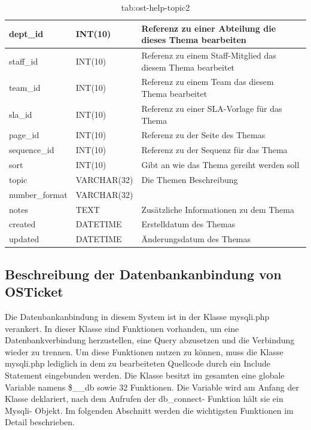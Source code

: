 		\begin{table}[h]
			\begin{tabular}{|p{3.5cm}|p{4cm}|p{6.2cm}|}
		\hline
		dept\_id & INT(10) & Referenz zu einer Abteilung die dieses Thema bearbeiten\\
		\hline
		staff\_id & INT(10) & Referenz zu einem Staff-Mitglied das diesem Thema bearbeitet\\
		\hline
		team\_id & INT(10) & Referenz zu einem Team das diesem Thema bearbeitet\\
		\hline
		sla\_id & INT(10) & Referenz zu einer SLA-Vorlage für das Thema\\
		\hline
		page\_id & INT(10) & Referenz zu der Seite des Themas\\
		\hline
		sequence\_id & INT(10) & Referenz zu der Sequenz für das Thema\\
		\hline
		sort & INT(10) & Gibt an wie das Thema gereiht werden soll\\
		\hline
		topic & VARCHAR(32) & Die Themen Beschreibung\\
		\hline
		number\_format & VARCHAR(32) & \\
		\hline
		notes & TEXT & Zusätzliche Informationen zu dem Thema\\
		\hline
		created & DATETIME & Erstelldatum des Themas\\
		\hline
		updated & DATETIME & Änderungsdatum des Themas\\
		\hline
		
	\end{tabular}
	\caption{tab:ost-help-topic2}
\end{table}
\label{tab:ost_help_topic2}

\newpage


\subsection{Beschreibung der Datenbankanbindung von OSTicket}
Die Datenbankanbindung in diesem System ist in der Klasse mysqli.php verankert. In dieser Klasse sind Funktionen vorhanden, um eine Datenbankverbindung herzustellen, eine Query abzusetzen und die Verbindung wieder zu trennen.
Um diese Funktionen nutzen zu können, muss die Klasse mysqli.php lediglich in dem zu bearbeiteten Quellcode durch ein Include Statement eingebunden werden.
Die Klasse besitzt im gesamten eine globale Variable namens \$\_\_db sowie 32 Funktionen. Die Variable wird am Anfang der Klasse deklariert, nach dem Aufrufen der db\_connect- Funktion hält sie ein Mysqli- Objekt.
Im folgenden Abschnitt werden die wichtigsten Funktionen im Detail beschrieben.

